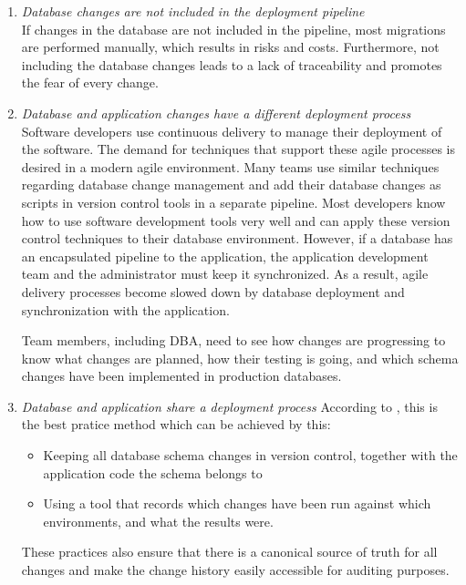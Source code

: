 \begin{enumerate}
	\item \textit{Database changes are not included in the deployment pipeline}\\
	If changes in the database are not included in the pipeline, most migrations are performed manually, which results in risks and costs. Furthermore, not including the database changes leads to a lack of traceability and promotes the fear of every change.	
	
	\item \textit{Database and application changes have a different deployment process}\\
	Software developers use continuous delivery to manage their deployment of the software. The demand for techniques that support these agile processes is desired in a modern agile environment. Many teams use similar techniques regarding database change management and add their database changes as scripts in version control tools in a separate pipeline. Most developers know how to use software development tools very well and can apply these version control techniques to their database environment. However, if a database has an encapsulated pipeline to the application, the application development team and the administrator must keep it synchronized. As a result, agile delivery processes become slowed down by database deployment and synchronization with the application.

	Team members, including \gls{DBA}, need to see how changes are progressing to know what changes are planned, how their testing is going, and which schema changes have been implemented in production databases.
	
	\item \textit{Database and application share a deployment process}
	According to  \cite{GoogleDevOps2022}, this is the best pratice method which can be achieved by this:
	\begin{itemize}
		\item Keeping all database schema changes in version control, together with the application code the schema belongs to
		\item Using a tool that records which changes have been run against which environments, and what the results were.
	\end{itemize}
	These practices also ensure that there is a canonical source of truth for all changes and make the change history easily accessible for auditing purposes.

\end{enumerate}

